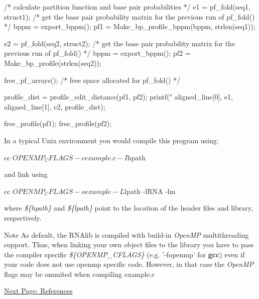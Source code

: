 \begin{DoxyVerb}
{   /* calculate partition function and base pair probabilities */
   e1 = pf_fold(seq1, struct1);
   /* get the base pair probability matrix for the previous run of pf_fold() */
   bppm = export_bppm();
   pf1 = Make_bp_profile_bppm(bppm, strlen(seq1));

   e2 = pf_fold(seq2, struct2);
   /* get the base pair probability matrix for the previous run of pf_fold() */
   bppm = export_bppm();
   pf2 = Make_bp_profile(strlen(seq2));

   free_pf_arrays();  /* free space allocated for pf_fold() */

   profile_dist = profile_edit_distance(pf1, pf2);
   printf("%
          aligned_line[0], e1, aligned_line[1], e2, profile_dist);

   free_profile(pf1); free_profile(pf2);
}
\end{DoxyVerb}


In a typical Unix environment you would compile this program using: \begin{DoxyVerb}
cc ${OPENMP_CFLAGS} -c example.c -I${hpath}
\end{DoxyVerb}
 and link using \begin{DoxyVerb}
cc ${OPENMP_CFLAGS} -o example -L${lpath} -lRNA -lm
\end{DoxyVerb}
 where {\itshape \$\{hpath\}\/} and {\itshape \$\{lpath\}\/} point to the location of the header files and library, respectively. \begin{DoxyNote}{Note}
As default, the RNAlib is compiled with build-\/in {\itshape OpenMP\/} multithreading support. Thus, when linking your own object files to the library you have to pass the compiler specific {\itshape \$\{OPENMP\_\-CFLAGS\}\/} (e.g. '-\/fopenmp' for {\bfseries gcc}) even if your code does not use openmp specific code. However, in that case the {\itshape OpenMP\/} flags may be ommited when compiling example.c
\end{DoxyNote}
\hyperlink{mp__ref}{Next Page: References} 